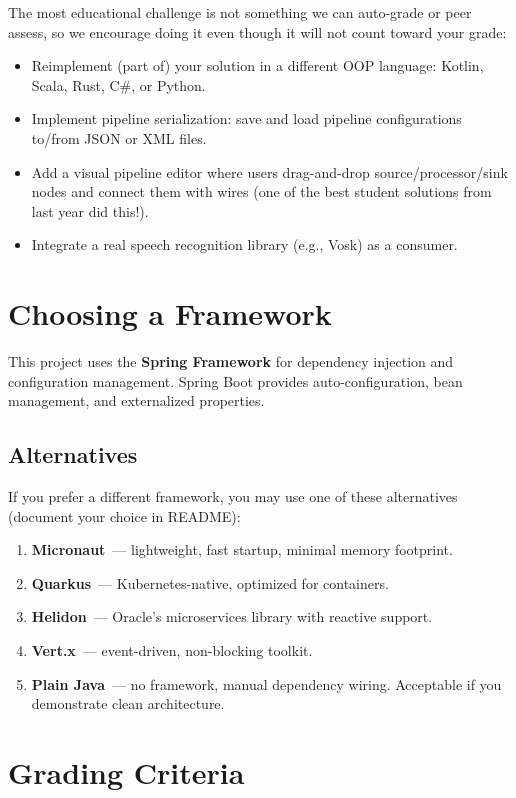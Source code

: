 \documentclass[a4paper,12pt]{article}
\begin{document}
The most educational challenge is not something we can auto-grade or peer assess,
so we encourage doing it even though it will not count toward your grade:

\begin{itemize}
    \item Reimplement (part of) your solution in a different OOP language:
          Kotlin, Scala, Rust, C\#, or Python.
    \item Implement pipeline serialization: save and load pipeline configurations
          to/from JSON or XML files.
    \item Add a visual pipeline editor where users drag-and-drop
          source/processor/sink nodes and connect them with wires
          (one of the best student solutions from last year did this!).
    \item Integrate a real speech recognition library (e.g., Vosk) as a consumer.
\end{itemize}


\section{Choosing a Framework}

This project uses the \textbf{Spring Framework} for dependency injection and configuration management.
Spring Boot provides auto-configuration, bean management, and externalized properties.

\subsection{Alternatives}
If you prefer a different framework, you may use one of these alternatives
(document your choice in README):
\begin{enumerate}
    \item \textbf{Micronaut}~--- lightweight, fast startup, minimal memory footprint.
    \item \textbf{Quarkus}~--- Kubernetes-native, optimized for containers.
    \item \textbf{Helidon}~--- Oracle's microservices library with reactive support.
    \item \textbf{Vert.x}~--- event-driven, non-blocking toolkit.
    \item \textbf{Plain Java}~--- no framework, manual dependency wiring.
          Acceptable if you demonstrate clean architecture.
\end{enumerate}


\section{Grading Criteria}
\end{document}
